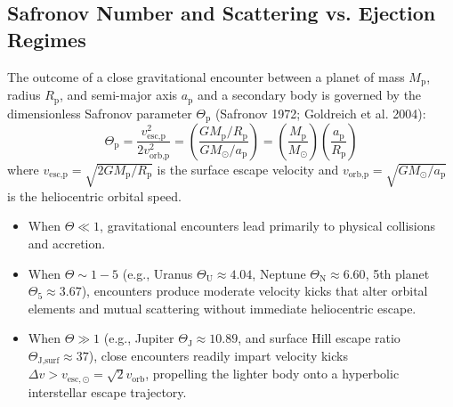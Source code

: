 \documentclass[11pt,a4paper]{article}
\begin{document}
\subsection{Safronov Number and Scattering vs. Ejection Regimes}
The outcome of a close gravitational encounter between a planet of mass $M_{\text{p}}$, radius $R_{\text{p}}$, and semi-major axis $a_{\text{p}}$ and a secondary body is governed by the dimensionless Safronov parameter $\Theta_{\text{p}}$ (Safronov 1972; Goldreich et al. 2004):
\begin{equation}
\Theta_{\text{p}} = \frac{v_{\text{esc,p}}^2}{2 v_{\text{orb,p}}^2} = \left(\frac{G M_{\text{p}} / R_{\text{p}}}{G M_\odot / a_{\text{p}}}\right) = \left(\frac{M_{\text{p}}}{M_\odot}\right) \left(\frac{a_{\text{p}}}{R_{\text{p}}}\right)
\end{equation}
where $v_{\text{esc,p}} = \sqrt{2 G M_{\text{p}} / R_{\text{p}}}$ is the surface escape velocity and $v_{\text{orb,p}} = \sqrt{G M_\odot / a_{\text{p}}}$ is the heliocentric orbital speed.
\begin{itemize}
    \item When $\Theta \ll 1$, gravitational encounters lead primarily to physical collisions and accretion.
    \item When $\Theta \sim 1 - 5$ (e.g., Uranus $\Theta_{\text{U}} \approx 4.04$, Neptune $\Theta_{\text{N}} \approx 6.60$, 5th planet $\Theta_5 \approx 3.67$), encounters produce moderate velocity kicks that alter orbital elements and mutual scattering without immediate heliocentric escape.
    \item When $\Theta \gg 1$ (e.g., Jupiter $\Theta_{\text{J}} \approx 10.89$, and surface Hill escape ratio $\Theta_{\text{J,surf}} \approx 37$), close encounters readily impart velocity kicks $\Delta v > v_{\text{esc},\odot} = \sqrt{2} v_{\text{orb}}$, propelling the lighter body onto a hyperbolic interstellar escape trajectory.
\end{itemize}
\end{document}
